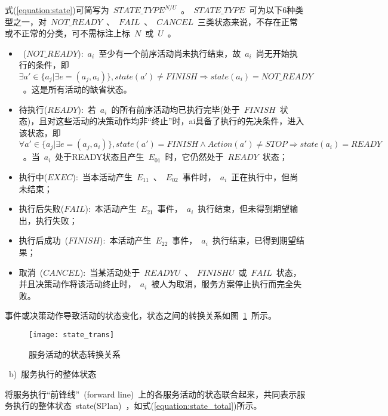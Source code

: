 式(\ref{equation:state})可简写为~$STATE\_TYPE^{N/U}$~。~$STATE\_TYPE$~可为以下6种类型之一，对~$NOT\_READY$~、~$FAIL$~、~$CANCEL$~三类状态来说，不存在正常或不正常的分类，可不需标注上标~$N$~或~$U$~。

\begin{itemize}
    
    \item ~($NOT\_READY$):~$a_i$~至少有一个前序活动尚未执行结束，故~$a_i$~尚无开始执行的条件，即~$\exists a' \in \{ {a_j}|\exists e = ( {{a_j},{a_i}} )\} ,state ( {a'} ) \ne FINISH \Rightarrow state ( {{a_i}} ) = NOT\_READY$~。这是所有活动的缺省状态。
    
    \item 待执行($READY$):~若~$a_i$~的所有前序活动均已执行完毕(处于~$FINISH$~状态)，且对这些活动的决策动作均非“终止”时，ai具备了执行的先决条件，进入该状态，即~$\forall a' \in \{ {a_j}|\exists e = ( {{a_j},{a_i}} )\} ,state ( {a'} ) = FINISH \wedge Action(a') \ne STOP \Rightarrow state ( {{a_i}} ) = READY$~。当~$a_i$~处于READY状态且产生~$E_{01}$~时，它仍然处于~$READY$~状态；
    
    \item 执行中($EXEC$):~当本活动产生~$E_{11}$~、~$E_{02}$~事件时，~$a_i$~正在执行中，但尚未结束；
    
    \item 执行后失败($FAIL$):~本活动产生~$E_{21}$~事件，~$a_i$~执行结束，但未得到期望输出，执行失败；
    
    \item 执行后成功~($FINISH$):~本活动产生~$E_{22}$~事件，~$a_i$~执行结束，已得到期望结果；
    
    \item 取消~($CANCEL$):~当某活动处于~$READYU$~、~$FINISHU$~或~$FAIL$~状态，并且决策动作将该活动终止时，~$a_i$~被人为取消，服务方案停止执行而完全失败。
\end{itemize}

事件或决策动作导致活动的状态变化，状态之间的转换关系如图~\ref{figure:state_trans}~所示。
\begin{figure}[htbp]
    \centering
    \texttt{[image: state\_trans]}
    \caption{服务活动的状态转换关系}\label{figure:state_trans}
    \vspace{-1em}
\end{figure}

~b)~服务执行的整体状态

将服务执行“前锋线”~(forward line)~上的各服务活动的状态联合起来，共同表示服务执行的整体状态~state(SPlan)~，如式(\ref{equation:state_total})所示。

